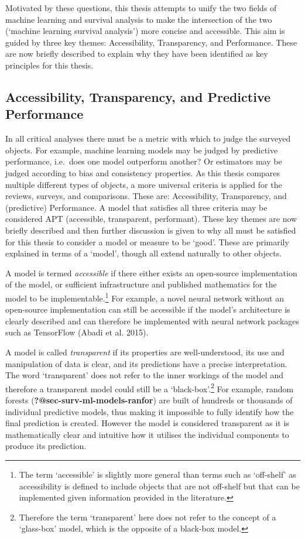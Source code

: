 \documentclass[
  letterpaper,
]{scrbook}
\theoremstyle{plain}
\theoremstyle{definition}
\theoremstyle{remark}
\begin{document}
Motivated by these questions, this thesis attempts to unify the two
fields of machine learning and survival analysis to make the
intersection of the two (`machine learning survival analysis') more
concise and accessible. This aim is guided by three key themes:
Accessibility, Transparency, and Performance. These are now briefly
described to explain why they have been identified as key principles for
this thesis.

\hypertarget{sec-intro-motobj-tap}{%
\subsection{Accessibility, Transparency, and Predictive
Performance}\label{sec-intro-motobj-tap}}

In all critical analyses there must be a metric with which to judge the
surveyed objects. For example, machine learning models may be judged by
predictive performance, i.e.~does one model outperform another? Or
estimators may be judged according to bias and consistency properties.
As this thesis compares multiple different types of objects, a more
universal criteria is applied for the reviews, surveys, and comparisons.
These are: Accessibility, Transparency, and (predictive) Performance. A
model that satisfies all three criteria may be considered APT
(accessible, transparent, performant). These key themes are now briefly
described and then further discussion is given to why all must be
satisfied for this thesis to consider a model or measure to be `good'.
These are primarily explained in terms of a `model', though all extend
naturally to other objects.

A model is termed \emph{accessible} if there either exists an
open-source implementation of the model, or sufficient infrastructure
and published mathematics for the model to be implementable.\footnote{The
  term `accessible' is slightly more general than terms such as
  `off-shelf' as accessibility is defined to include objects that are
  not off-shelf but that can be implemented given information provided
  in the literature.} For example, a novel neural network without an
open-source implementation can still be accessible if the model's
architecture is clearly described and can therefore be implemented with
neural network packages such as TensorFlow (Abadi et al. 2015).

A model is called \emph{transparent} if its properties are
well-understood, its use and manipulation of data is clear, and its
predictions have a precise interpretation. The word `transparent' does
not refer to the inner workings of the model and therefore a transparent
model could still be a `black-box'.\footnote{Therefore the term
  `transparent' here does not refer to the concept of a `glass-box'
  model, which is the opposite of a black-box model.} For example,
random forests (\textbf{?@sec-surv-ml-models-ranfor}) are built of
hundreds or thousands of individual predictive models, thus making it
impossible to fully identify how the final prediction is created.
However the model is considered transparent as it is mathematically
clear and intuitive how it utilises the individual components to produce
its prediction.
\end{document}
